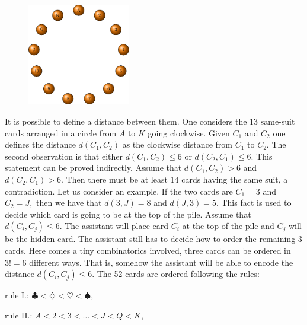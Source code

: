 \begin{figure}
\includegraphics[width=0.4\textwidth]{KartyaKorbe.pdf}
\end{figure}
It is possible to define a distance between them. One considers the 13 same-suit cards arranged in a circle from $A$ to $K$ going clockwise. 
Given $C_1$ and $C_2$ one defines the distance $d(C_1,C_2)$ as the clockwise distance from $C_1$ to $C_2$. The second observation is that either $d(C_1,C_2)\leq 6$ or $d(C_2,C_1)\leq 6$. This statement can be proved
indirectly. Assume that $d(C_1,C_2)>6$ and $d(C_2,C_1)>6$. Then there must be at least 14 cards having the same suit, a contradiction.
Let us consider an example. 
If the two cards are $C_1=3$ and $C_2=J,$ then we have that $d(3,J)=8$ and $d(J,3)=5$. This fact is used to decide which card is going to be at the top of the pile. Assume that $d(C_i,C_j)\leq 6$. The assistant will
place card $C_i$ at the top of the pile and $C_j$ will be the hidden card. The assistant still has to decide how to order the remaining 3 cards. Here comes a tiny combinatorics
involved, three cards can be ordered in $3!=6$ different ways. That is, somehow the assistant will be able to encode the distance $d(C_i,C_j)\leq 6$. The 52 cards are ordered following the 
rules: 

rule I.: $\clubsuit<\diamondsuit<\heartsuit<\spadesuit$,

rule II.: $A<2<3<\ldots<J<Q<K$,

